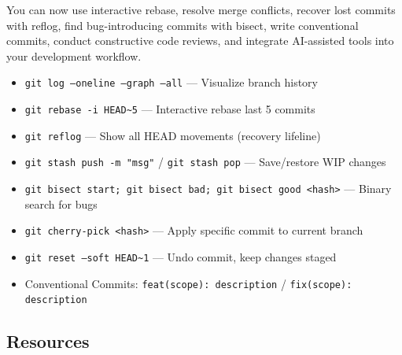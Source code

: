 \documentclass[11pt, a4paper, oneside]{report}
\begin{document}
\begin{microcheckpoint}
You can now use interactive rebase, resolve merge conflicts, recover lost commits with reflog, find bug-introducing commits with bisect, write conventional commits, conduct constructive code reviews, and integrate AI-assisted tools into your development workflow.
\end{microcheckpoint}

\begin{cheatsheetbox}
\begin{itemize}[leftmargin=*]
\item \texttt{git log --oneline --graph --all} --- Visualize branch history
\item \texttt{git rebase -i HEAD\textasciitilde{}5} --- Interactive rebase last 5 commits
\item \texttt{git reflog} --- Show all HEAD movements (recovery lifeline)
\item \texttt{git stash push -m "msg"} / \texttt{git stash pop} --- Save/restore WIP changes
\item \texttt{git bisect start; git bisect bad; git bisect good <hash>} --- Binary search for bugs
\item \texttt{git cherry-pick <hash>} --- Apply specific commit to current branch
\item \texttt{git reset --soft HEAD\textasciitilde{}1} --- Undo commit, keep changes staged
\item Conventional Commits: \texttt{feat(scope): description} / \texttt{fix(scope): description}
\end{itemize}
\end{cheatsheetbox}

\subsection*{Resources}
\end{document}
